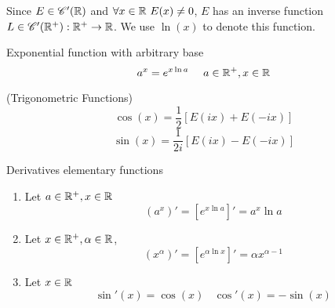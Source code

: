    Since $E \in \mathscr{C}'(\mathbb{R})$ and $\forall x \in \mathbb{R} \ E(x) \neq 0$, $E$ has an inverse function $L \in \mathscr{C}'(\mathbb{R}^+): \mathbb{R}^+ \to \mathbb{R}$. We use $\ln(x)$ to denote this function.

    \begin{defi}
        Exponential function with arbitrary base
        \begin{equation}
            a^x = e^{x \ln a} \ \ \ \ a \in \mathbb{R}^+, x \in \mathbb{R}
        \end{equation}
    \end{defi}

    \begin{defi}
        (Trigonometric Functions) 
        \begin{equation}
            \cos(x) = \frac{1}{2}[E(ix)+E(-ix)]
        \end{equation}
        \begin{equation}
            \sin(x) = \frac{1}{2i}[E(ix)-E(-ix)]
        \end{equation}
    \end{defi}

    \begin{theo}
        Derivatives elementary functions
        \begin{enumerate}
            \item Let $a \in \mathbb{R}^+, x \in \mathbb{R}$
            \begin{equation}
                \left( a^x \right)' = \left[ e^{x \ln a} \right]' = a^x \ln a
            \end{equation}

            \item Let $x \in \mathbb{R}^+, \alpha \in \mathbb{R}$,
            \begin{equation}
                \left(x^{\alpha}\right)' = \left[ e^{\alpha \ln x} \right]' = \alpha x^{\alpha-1} 
            \end{equation}

            \item Let $x \in \mathbb{R}$
            \begin{equation}
                \sin'(x) = \cos(x) \ \ \ \ \cos'(x) = -\sin(x)
            \end{equation}
        \end{enumerate} 
    \end{theo}

